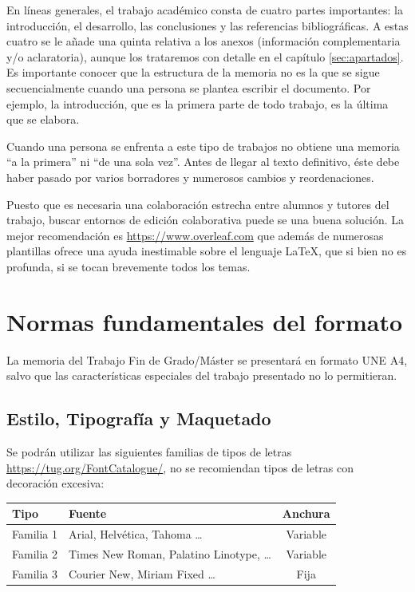 En líneas generales, el trabajo académico consta de cuatro partes importantes: la introducción, el desarrollo, las conclusiones y las referencias bibliográficas. A estas cuatro se le añade una quinta relativa  a  los  anexos  (información  complementaria  y/o  aclaratoria), aunque los trataremos con detalle en el capítulo \ref{sec:apartados}.  Es  importante  conocer  que  la  estructura de la memoria no  es  la  que  se  sigue  secuencialmente cuando  una  persona  se  plantea escribir el documento. Por  ejemplo,  la  introducción,  que  es  la  primera  parte  de  todo  trabajo,  es  la  última que se elabora.

Cuando  una  persona  se  enfrenta  a  este  tipo  de  trabajos no obtiene una memoria “a la primera” ni “de una sola vez”. Antes de llegar al texto definitivo, éste debe haber pasado por varios borradores y numerosos cambios y reordenaciones.

Puesto que es necesaria una colaboración estrecha entre alumnos y tutores del trabajo, buscar entornos de edición colaborativa puede se una buena solución. La mejor recomendación es \url{https://www.overleaf.com} que además de numerosas plantillas ofrece una ayuda inestimable sobre el lenguaje \LaTeX{}, que si bien no es profunda, si se tocan brevemente todos los temas.

\chapter{Normas fundamentales del formato} 
\label{sec:funda}

La memoria del Trabajo Fin de Grado/Máster se presentará en formato  UNE  A4,  salvo  que  las  características  especiales  del  trabajo  presentado  no  lo permitieran.

\section {Estilo,  Tipografía y    Maquetado}

Se podrán utilizar las siguientes familias de tipos de letras \url{https://tug.org/FontCatalogue/}, no se recomiendan tipos de letras con decoración excesiva:

	\begin{center}
	\begin{tabular}{p{2cm}p{7.5cm}c}
		\textbf{Tipo} & \textbf{Fuente} & \textbf{Anchura} \\ \hline
         Familia 1 & Arial, Helvética, Tahoma  	\ldots & Variable \\
         Familia 2 & Times New Roman, Palatino  Linotype,  	\ldots & Variable  \\
         Familia 3 & Courier  New,  Miriam Fixed \ldots & Fija\\
         \hline
	\end{tabular}
	\end{center}



